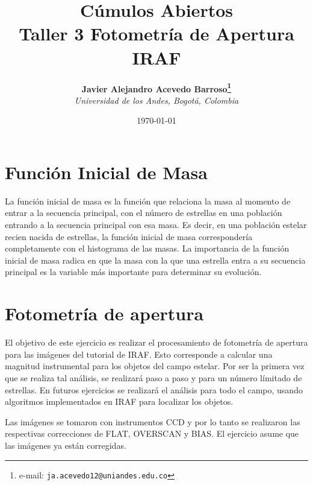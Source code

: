 \documentclass[12pt]{article}
\begin{document}
\title{Cúmulos Abiertos \\ Taller 3 Fotometría de Apertura IRAF}

\author{
\textbf{Javier Alejandro Acevedo Barroso\thanks{e-mail: \texttt{ja.acevedo12@uniandes.edu.co}}}\\
\textit{Universidad de los Andes, Bogotá, Colombia}\\
 }%

\date{\today}
\maketitle %


\normalsize
\newpage


\section{Función Inicial de Masa}
La función inicial de masa es la función que relaciona la masa al momento de entrar a la secuencia principal, con el número de estrellas en una población entrando a la secuencia principal con esa masa. Es decir, en una población estelar recien nacida de estrellas, la función inicial de masa correspondería completamente con el histograma de las masas. La importancia de la función inicial de masa radica en que la masa con la que una estrella entra a su secuencia principal es la variable más importante para determinar su evolución.



\section{Fotometría de apertura}
El objetivo de este ejercicio es realizar el procesamiento de fotometría de apertura para las imágenes del tutorial de IRAF. Esto corresponde a calcular una magnitud instrumental para los objetos del campo estelar. Por ser la primera vez que se realiza tal análisis, se realizará paso a paso y para un número límitado de estrellas. En futuros ejercicios se realizará el análisis para todo el campo, usando algoritmos implementados en IRAF para localizar los objetos.

Las imágenes se tomaron con instrumentos CCD y por lo tanto se realizaron las respectivas correcciones de FLAT, OVERSCAN y BIAS. El ejercicio asume que las imágenes ya están corregidas.
\end{document}
